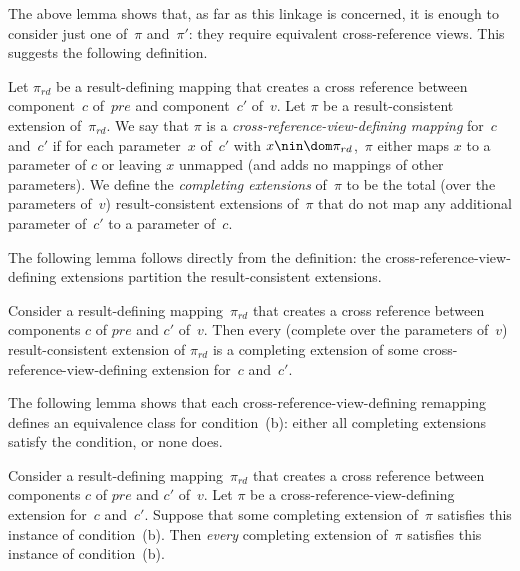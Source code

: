 The above lemma shows that, as far as this linkage is concerned, it is enough
to consider just one of~$\pi$ and~$\pi'$: they require equivalent
cross-reference views.  This suggests the following definition.


\begin{definition}
\label{def:cross-reference-view-defining}
Let $\pi_{rd}$ be a result-defining mapping that creates a cross reference
between component~$c$ of~$pre$ and component~$c'$ of~$v$.
%
Let $\pi$ be a result-consistent extension of~$\pi_{rd}$.  We say that $\pi$
is a \emph{cross-reference-view-defining mapping} for~$c$ and~$c'$ if for each
parameter~$x$ of~$c'$ with $x \nin \dom \pi_{rd}$,\, $\pi$ either maps $x$ to
a parameter of $c$ or leaving $x$ unmapped (and adds no mappings of other
parameters).
%
We define the \emph{completing extensions} of~$\pi$ to be the total (over the
parameters of~$v$) result-consistent extensions of~$\pi$ that do not map any
additional parameter of~$c'$ to a parameter of~$c$.
\end{definition}


The following lemma follows directly from the definition: the
cross-reference-view-defining extensions partition the result-consistent
extensions. 
%
\begin{lemma}
\label{lem:cross-reference-view-defining-partition}
Consider a result-defining mapping~$\pi_{rd}$ that creates a cross reference
between components $c$ of $pre$ and $c'$ of~$v$.  Then every (complete over
the parameters of~$v$) result-consistent extension of $\pi_{rd}$ is a
completing extension of some cross-reference-view-defining extension for~$c$
and~$c'$.
\end{lemma}


The following lemma shows that each cross-reference-view-defining remapping
defines an equivalence class for condition~(b): either all completing
extensions satisfy the condition, or none does.
%
\begin{lemma}
\label{lem:cross-reference-view-defining}
Consider a result-defining mapping~$\pi_{rd}$ that creates a cross reference
between components $c$ of $pre$ and $c'$ of~$v$.  Let $\pi$ be a
cross-reference-view-defining extension for~$c$ and~$c'$.  Suppose that some
completing extension of~$\pi$ satisfies this instance of condition~(b).
Then \emph{every} completing extension of~$\pi$ satisfies this instance of
condition~(b).
\end{lemma}

